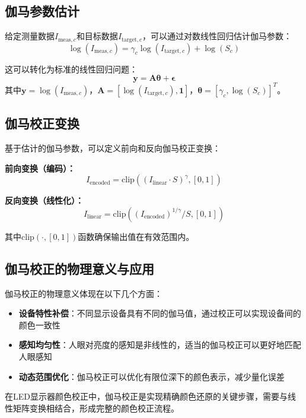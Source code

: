 \subsection[\hspace{-2pt}伽马参数估计]{{\heiti{} \hspace{-8pt}伽马参数估计}}\label{subsection2: 伽马参数估计}

给定测量数据$I_{\text{meas},c}$和目标数据$I_{\text{target},c}$，可以通过对数线性回归估计伽马参数：
\begin{equation}
\log(I_{\text{meas},c}) = \gamma_c \log(I_{\text{target},c}) + \log(S_c)
\end{equation}

这可以转化为标准的线性回归问题：
\begin{equation}
\mathbf{y} = \mathbf{A}\boldsymbol{\theta} + \boldsymbol{\epsilon}
\end{equation}
其中$\mathbf{y} = \log(I_{\text{meas},c})$，$\mathbf{A} = [\log(I_{\text{target},c}), \mathbf{1}]$，$\boldsymbol{\theta} = [\gamma_c, \log(S_c)]^T$。

\subsection[\hspace{-2pt}伽马校正变换]{{\heiti{} \hspace{-8pt}伽马校正变换}}\label{subsection2: 伽马校正变换}

基于估计的伽马参数，可以定义前向和反向伽马校正变换：

\textbf{前向变换（编码）：}
\begin{equation}
I_{\text{encoded}} = \mathrm{clip}((I_{\text{linear}} \cdot S)^{\gamma}, [0,1])
\end{equation}

\textbf{反向变换（线性化）：}
\begin{equation}
I_{\text{linear}} = \mathrm{clip}((I_{\text{encoded}})^{1/\gamma} / S, [0,1])
\end{equation}

其中$\mathrm{clip}(\cdot, [0,1])$函数确保输出值在有效范围内。

\subsection[\hspace{-2pt}伽马校正的物理意义与应用]{{\heiti{} \hspace{-8pt}伽马校正的物理意义与应用}}\label{subsection2: 伽马校正的物理意义与应用}

伽马校正的物理意义体现在以下几个方面：

\begin{itemize}
    \item \textbf{设备特性补偿}：不同显示设备具有不同的伽马值，通过校正可以实现设备间的颜色一致性
    \item \textbf{感知均匀性}：人眼对亮度的感知是非线性的，适当的伽马校正可以更好地匹配人眼感知
    \item \textbf{动态范围优化}：伽马校正可以优化有限位深下的颜色表示，减少量化误差
\end{itemize}

在LED显示器颜色校正中，伽马校正是实现精确颜色还原的关键步骤，需要与线性矩阵变换相结合，形成完整的颜色校正流程。